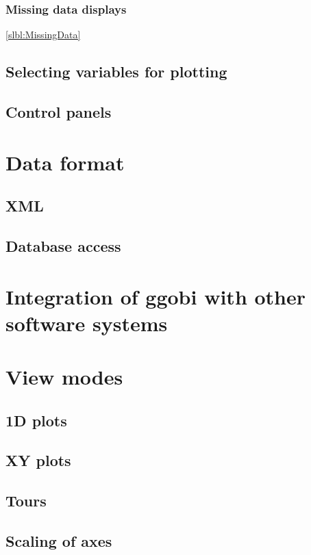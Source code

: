 \documentclass[11pt]{article}
\begin{document}
\subsubsection{Missing data displays}
\ref{slbl:MissingData}


\subsection{Selecting variables for plotting}
\subsection{Control panels}

\section{Data format}
\label{slbl:DataFormat}
\subsection {XML}
\label{slbl:XML}
\subsection {Database access}
\label{slbl:MySQL}

\section{Integration of ggobi with other software systems}
\label{slbl:Integration}

\section{View modes}
\label{slbl:ViewModes}

\subsection{1D plots}
\subsection{XY plots}
\subsection{Tours}
\label{slbl:1DTour}


\subsection{Scaling of axes}
\label{slbl:Scaling}
\end{document}
